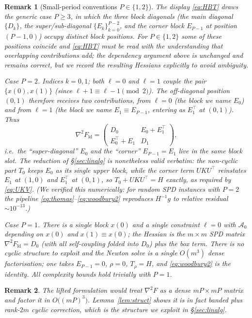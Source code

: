 \documentclass{amsart}
\newtheorem{remark}{Remark}
\begin{document}
\begin{remark}[Small-period conventions $P\in\{1,2\}$]\label{rem:smallP}
The display \eqref{eq:HBT} draws the generic case $P\ge3$, in which the three
block diagonals (the main diagonal $\{D_k\}$, the super/sub-diagonal $\{E_k\}_{k=0}^{P-2}$,
and the corner block $E_{P-1}$ at position $(P-1,0)$) occupy \emph{distinct} block
positions. For $P\in\{1,2\}$ some of these positions coincide and \eqref{eq:HBT}
must be read with the understanding that overlapping contributions \emph{add}; the
dependency argument above is unchanged and remains correct, but we record the
resulting Hessians explicitly to avoid ambiguity.

\emph{Case $P=2$.} Indices $k=0,1$; both $\ell=0$ and $\ell=1$ couple the pair
$\{x(0),x(1)\}$ (since $\ell+1\equiv\ell-1\pmod2$). The off-diagonal position
$(0,1)$ therefore receives \emph{two} contributions, from $\ell=0$ (the block we
name $E_0$) and from $\ell=1$ (the block we name $E_1\equiv E_{P-1}$, entering as
$E_1^{\!\top}$ at $(0,1)$). Thus
\[
  \nabla^2F_{\mathrm{ld}}=\begin{pmatrix} D_0 & E_0+E_1^{\!\top}\\ E_0^{\!\top}+E_1 & D_1\end{pmatrix},
\]
i.e.\ the ``super-diagonal'' $E_0$ and the ``corner'' $E_{P-1}=E_1$ live in the same
block slot. The reduction of \S\ref{sec:linalg} is nonetheless valid verbatim: the
non-cyclic part $T_0$ keeps $E_0$ as its single upper block, while the corner term
$UKU^{\!\top}$ reinstates $E_1$ at $(1,0)$ and $E_1^{\!\top}$ at $(0,1)$, so
$T_0+UKU^{\!\top}=H$ exactly, as required by \eqref{eq:UKV}. (We verified this
numerically: for random SPD instances with $P=2$ the pipeline
\eqref{eq:thomas}--\eqref{eq:woodbury2} reproduces $H^{-1}g$ to relative residual
$\sim10^{-13}$.)

\emph{Case $P=1$.} There is a single block $x(0)$ and a single constraint $\ell=0$
with $\mathcal A_0$ depending on $x(0)$ and $x(1)\equiv x(0)$; the Hessian is the
$m\times m$ SPD matrix $\nabla^2F_{\mathrm{ld}}=D_0$ (with all self-coupling folded
into $D_0$) plus the box term. There is no cyclic structure to exploit and the Newton
solve is a single $O(m^3)$ dense factorisation; one takes $E_{P-1}=0$, $\rho=0$,
$T_\rho=H$, and \eqref{eq:woodbury2} is the identity. All complexity bounds hold
trivially with $P=1$.
\end{remark}

\begin{remark}
The lifted formulation would treat $\nabla^2F$ as a dense $mP\times mP$ matrix and
factor it in $O\!\big((mP)^3\big)$. Lemma~\ref{lem:struct} shows it is in fact
banded plus rank-$2m$ cyclic correction, which is the structure we exploit in
\S\ref{sec:linalg}.
\end{remark}
\end{document}
